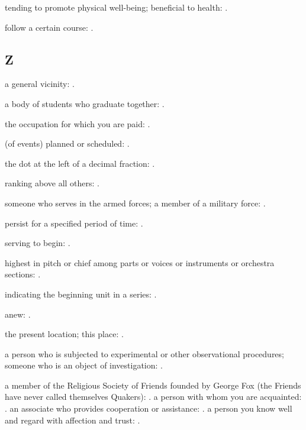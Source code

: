   tending to promote physical well-being; beneficial to health:   .

  follow a certain course:   .

\subsection*{Z}

  a general vicinity: .

  a body of students who graduate together:   .

  the occupation for which you are paid:   .

  (of events) planned or scheduled: .

  the dot at the left of a decimal fraction:   .

  ranking above all others:   .

  someone who serves in the armed forces; a member of a military force:   .

  persist for a specified period of time:   .

  serving to begin:   .

  highest in pitch or chief among parts or voices or instruments or orchestra sections: .

  indicating the beginning unit in a series:   .

  anew:   .

  the present location; this place: .

  a person who is subjected to experimental or other observational procedures; someone who is an object of investigation:   .

  a member of the Religious Society of Friends founded by George Fox (the Friends have never called themselves Quakers):   . a person with whom you are acquainted:   . an associate who provides cooperation or assistance:   . a person you know well and regard with affection and trust: .

